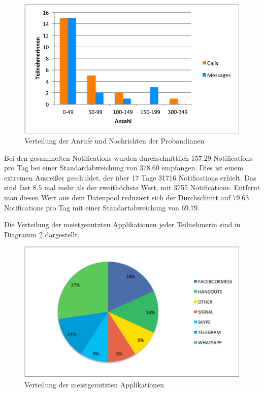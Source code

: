 \begin{figure}[h]
    \centering
    \includegraphics{images/callsMessagesDistr.pdf}
    \caption{Verteilung der Anrufe und Nachrichten der Probandinnen}
    \label{fig:callmessagesdistr}
\end{figure}


Bei den gesammelten Notifications wurden durchschnittlich $157.29$ Notifications pro Tag bei einer Standardabweichung von $378.60$ empfangen.
Dies ist einem extremen Ausreißer geschuldet, der über 17 Tage 31716 Notifications erhielt. 
Das sind fast $8.5$ mal mehr als der zweithöchste Wert, mit 3755 Notifications.
Entfernt man diesen Wert aus dem Datenpool reduziert sich der Durchschnitt auf $79.63$ Notifications pro Tag mit einer Standartabweichung von $69.79$.
\par
Die Verteilung der meistgenutzten Applikationen jeder Teilnehmerin sind in Diagramm \ref{fig:mostusedapp} dargestellt.

\begin{figure}[h]
    \centering
    \includegraphics{images/MostUsedApp.pdf}
    \caption{Verteilung der meistgenutzten Applikationen}
    \label{fig:mostusedapp}
\end{figure}

